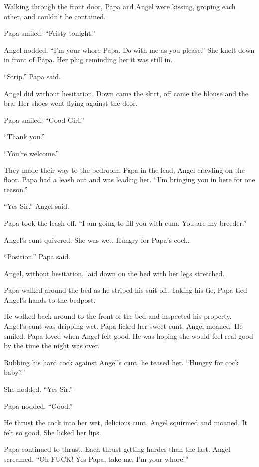      Walking through the front door, Papa and Angel were kissing, groping each other, and couldn’t be contained.

     Papa smiled. “Feisty tonight.”

     Angel nodded. “I’m your whore Papa. Do with me as you please.” She knelt down in front of Papa. Her plug reminding her it was still in.

     “Strip.” Papa said.

     Angel did without hesitation. Down came the skirt, off came the blouse and the bra. Her shoes went flying against the door.

     Papa smiled. “Good Girl.”

     “Thank you.”

     “You’re welcome.”

     They made their way to the bedroom. Papa in the lead, Angel crawling on the floor. Papa had a leash out and was leading her. “I’m bringing you in here for one reason.”

     “Yes Sir.” Angel said.

     Papa took the leash off. “I am going to fill you with cum. You are my breeder.”

     Angel’s cunt quivered. She was wet. Hungry for Papa’s cock.

     “Position.” Papa said.

     Angel, without hesitation, laid down on the bed with her legs stretched.

     Papa walked around the bed as he striped his suit off. Taking his tie, Papa tied Angel’s hands to the bedpost.

     He walked back around to the front of the bed and inspected his property. Angel’s cunt was dripping wet. Papa licked her sweet cunt. Angel moaned. He smiled. Papa loved when Angel felt good. He was hoping she would feel real good by the time the night was over.

     Rubbing his hard cock against Angel’s cunt, he teased her. “Hungry for cock baby?”

     She nodded. “Yes Sir.”

     Papa nodded. “Good.”

     He thrust the cock into her wet, delicious cunt. Angel squirmed and moaned. It felt so good. She licked her lips.

     Papa continued to thrust. Each thrust getting harder than the last. Angel screamed. “Oh FUCK! Yes Papa, take me. I’m your whore!”


